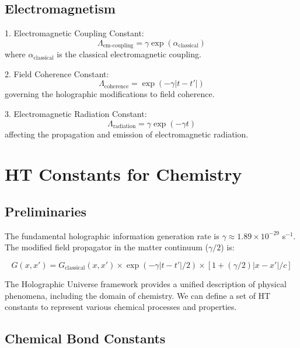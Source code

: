 \documentclass{article}
\theoremstyle{plain}
\theoremstyle{definition}
\theoremstyle{remark}
\begin{document}
\subsection*{Electromagnetism}

1. Electromagnetic Coupling Constant:
   \begin{equation}
   \Lambda_\text{em-coupling} = \gamma\exp(\alpha_\text{classical})
   \end{equation}
   where $\alpha_\text{classical}$ is the classical electromagnetic coupling.

2. Field Coherence Constant:
   \begin{equation}
   \Lambda_\text{coherence} = \exp(-\gamma|t-t'|)
   \end{equation}
   governing the holographic modifications to field coherence.

3. Electromagnetic Radiation Constant:
   \begin{equation}
   \Lambda_\text{radiation} = \gamma\exp(-\gamma t)
   \end{equation}
   affecting the propagation and emission of electromagnetic radiation.

   \section{HT Constants for Chemistry}

\subsection{Preliminaries}

The fundamental holographic information generation rate is $\gamma \approx 1.89 \times 10^{-29}$ s$^{-1}$. The modified field propagator in the matter continuum ($\gamma/2$) is:

\begin{equation}
G(x,x') = G_\text{classical}(x,x') \times \exp(-\gamma|t-t'|/2) \times \left[1 + (\gamma/2)|x-x'|/c\right]
\end{equation}

The Holographic Universe framework provides a unified description of physical phenomena, including the domain of chemistry. We can define a set of HT constants to represent various chemical processes and properties.

\subsection{Chemical Bond Constants}
\end{document}
